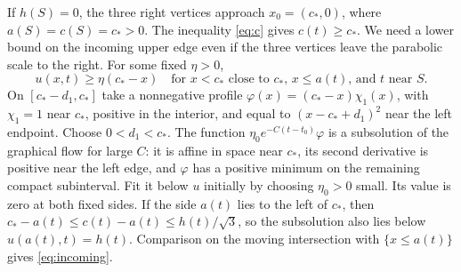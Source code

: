 If \(h(S)=0\), the three right vertices approach \(x_0=(c_*,0)\),
where \(a(S)=c(S)=c_*>0\). The inequality \eqref{eq:c} gives
\(c(t)\ge c_*\). We need a lower bound on the incoming upper edge
even if the three vertices leave the parabolic scale to the right.
For some fixed \(\eta>0\),
\begin{equation}
 u(x,t)\ge \eta(c_*-x)\quad
 \text{for \(x<c_*\) close to \(c_*\), \(x\le a(t)\), and \(t\) near \(S\)}.
 \label{eq:incoming}
\end{equation}
On \([c_*-d_1,c_*]\) take a nonnegative profile
\(\varphi(x)=(c_*-x)\chi_1(x)\), with \(\chi_1=1\) near \(c_*\),
positive in the interior, and equal to \((x-c_*+d_1)^2\) near the
left endpoint. Choose \(0<d_1<c_*\). The function
\(\eta_0 e^{-C(t-t_0)}\varphi\) is a subsolution of the graphical
flow for large \(C\): it is affine in space near \(c_*\), its second
derivative is positive near the left edge, and \(\varphi\) has a
positive minimum on the remaining compact subinterval. Fit it below
\(u\) initially by choosing \(\eta_0>0\) small. Its value is zero at
both fixed sides. If the side \(a(t)\) lies to the left of \(c_*\),
then \(c_*-a(t)\le c(t)-a(t)\le h(t)/\sqrt3\), so the subsolution
also lies below \(u(a(t),t)=h(t)\). Comparison on the moving
intersection with \(\{x\le a(t)\}\) gives \eqref{eq:incoming}.

